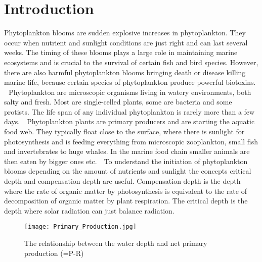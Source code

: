 \documentclass[../Main.tex]{subfiles}
\begin{document}
\section*{\crule[blue]{.3cm}{.3cm} Introduction}
Phytoplankton blooms are sudden explosive increases in phytoplankton. They occur when nutrient and sunlight conditions are just right and can last several weeks. The timing of these blooms plays a large role in maintaining marine ecosystems and is crucial to the survival of certain fish and bird species. However, there are also harmful phytoplankton blooms bringing death or disease killing marine life, because certain species of phytoplankton produce powerful biotoxins. \supercite{Prim2021} 
Phytoplankton are microscopic organisms living in watery environments, both salty and fresh. Most are single-celled plants, some are bacteria and some protists. The life span of any individual phytoplankton is rarely more than a few days. \supercite{Prim2021}  Phytoplankton plants are primary producers and are starting the aquatic food web. They typically float close to the surface, where there is sunlight for photosynthesis and is feeding everything from microscopic zooplankton, small fish and invertebrates to huge whales. In the marine food chain smaller animals are then eaten by bigger ones etc. \supercite{Prim2021}  To understand the initiation of phytoplankton blooms depending on the amount of nutrients and sunlight the concepts critical depth and compensation depth are useful. Compensation depth is the depth where the rate of organic matter by photosynthesis is equivalent to the rate of decomposition of organic matter by plant respiration. The critical depth is the depth where solar radiation can just balance radiation.\supercite{Sverdrup1953OnCF}    
\begin{figure}[H]
\texttt{[image: Primary\_Production.jpg]}
\caption{The relationship between the water depth and net primary production (=P-R) \supercite{Nasa2021}}
\end{figure}
\end{document}
